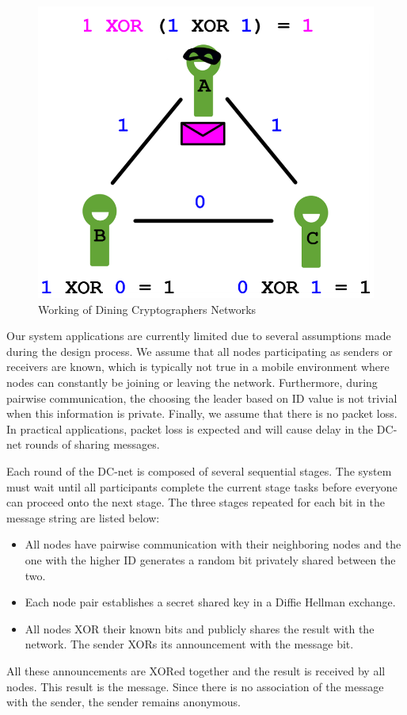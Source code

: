 \documentclass{acm_proc_article-sp}
\begin{document}
\begin{figure}
\centering
\includegraphics[scale=.30]{DCNet.png} \caption{Working of Dining Cryptographers Networks}
\label{fig:DCNet}

\end{figure}

Our system applications are currently limited due to several assumptions made during the design process. We assume that all nodes participating as senders or receivers are known, which is typically not true in a mobile environment where nodes can constantly be joining or leaving the network. Furthermore, during pairwise communication, the choosing the leader based on ID value is not trivial when this information is private. Finally, we assume that there is no packet loss. In practical applications, packet loss is expected and will cause delay in the DC-net rounds of sharing messages.
 
Each round of the DC-net is composed of several sequential stages. The system must wait until all participants complete the current stage tasks before everyone can proceed onto the next stage. The three stages repeated for each bit in the message string are listed below:
\begin{itemize}
\item All nodes have pairwise communication with their neighboring nodes and the one with the higher ID generates a random bit privately shared between the two.
\item Each node pair establishes a secret shared key in a Diffie Hellman exchange.
\item All nodes XOR their known bits and publicly shares the result with the network. The sender XORs its announcement with the message bit.
\end{itemize}
All these announcements are XORed together and the result is received by all nodes. This result is the message. Since there is no association of the message with the sender, the sender remains anonymous. 
\end{document}
